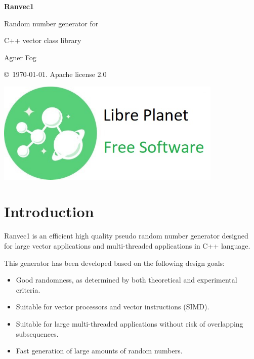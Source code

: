 \documentclass[11pt,a4paper,oneside,openright]{report}
\newcommand{\vspacesmall}{\vspace{3mm}}
\newcommand{\vspacebig}{\vspace{6mm}}
\begin{document}
\begin{titlepage}
    \centering
   
    \null %
    \vfill

   {\bfseries\Huge
    Ranvec1
    \vspacesmall
    
    Random number generator for 
    \vspacesmall
        
    C++ vector class library 
    \vspacebig
        
   }        
    \vspacebig
    
   {\Large    
    Agner Fog
    \vspacebig
    
    \copyright\ \today. Apache license 2.0
   }
    
    \vfill
    
    \includegraphics[width=306pt]{freesoftwarelogo.jpg}
    \vfill
    
\end{titlepage}

\RaggedRight

\chapter{Introduction}\label{chap:Introduction}

Ranvec1 is an efficient high quality pseudo random number generator designed for large vector applications and multi-threaded applications in C++ language.
\vspacesmall

This generator has been developed based on the following design goals:

\begin{itemize}

\item Good randomness, as determined by both theoretical and experimental criteria.

\item Suitable for vector processors and vector instructions (SIMD).

\item Suitable for large multi-threaded applications without risk of overlapping subsequences.

\item Fast generation of large amounts of random numbers.

\end{itemize}
\end{document}
